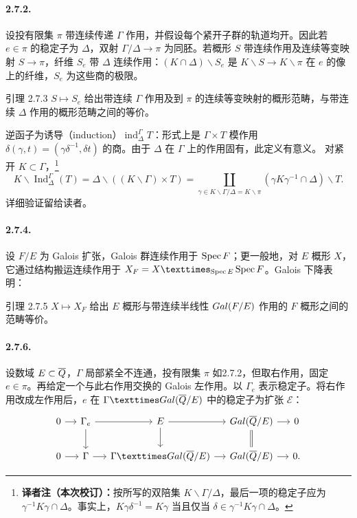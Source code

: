 \paragraph*{2.7.2.} 设投有限集 $\pi$ 带连续传递 $\Gamma$ 作用，并假设每个紧开子群的轨道均开。因此若 $e\in\pi$ 的稳定子为 $\Delta$，双射 $\Gamma/\Delta\to\pi$ 为同胚。若概形 $S$ 带连续作用及连续等变映射 $S\to\pi$，纤维 $S_e$ 带 $\Delta$ 连续作用：$(K\cap\Delta)\backslash S_e$ 是 $K\backslash S\to K\backslash\pi$ 在 $e$ 的像上的纤维，$S_e$ 为这些商的极限。
\begin{originaltheorem}{引理 2.7.3}
$S\mapsto S_e$ 给出带连续 $\Gamma$ 作用及到 $\pi$ 的连续等变映射的概形范畴，与带连续 $\Delta$ 作用的概形范畴之间的等价。
\end{originaltheorem}
逆函子为诱导（induction）$\operatorname{ind}_\Delta^\Gamma T$：形式上是 $\Gamma\times T$ 模作用 $\delta(\gamma,t)=(\gamma\delta^{-1},\delta t)$ 的商。由于 $\Delta$ 在 $\Gamma$ 上的作用固有，此定义有意义。
对紧开 $K\subset\Gamma$，\footnote{\textbf{译者注（本次校订）：}按所写的双陪集 $K\backslash\Gamma/\Delta$，最后一项的稳定子应为 $\gamma^{-1}K\gamma\cap\Delta$。事实上，$K\gamma\delta^{-1}=K\gamma$ 当且仅当 $\delta\in\gamma^{-1}K\gamma\cap\Delta$。}
\[
 K\backslash\operatorname{Ind}_\Delta^\Gamma(T)
 =\Delta\backslash((K\backslash\Gamma)\times T)
 =\coprod_{\gamma\in K\backslash\Gamma/\Delta=K\backslash\pi}
 (\gamma K\gamma^{-1}\cap\Delta)\backslash T.
\]
详细验证留给读者。
\paragraph*{2.7.4.} 设 $F/E$ 为 Galois 扩张，Galois 群连续作用于 $\operatorname{Spec} F$；更一般地，对 $E$ 概形 $X$，它通过结构搬运连续作用于 $X_F=X\times_{\Spec E}\Spec F$。Galois 下降表明：
\begin{originaltheorem}{引理 2.7.5}
$X\mapsto X_F$ 给出 $E$ 概形与带连续半线性 $Gal(F/E)$ 作用的 $F$ 概形之间的范畴等价。
\end{originaltheorem}
\paragraph*{2.7.6.} 设数域 $E\subset\overline{Q}$，$\Gamma$ 局部紧全不连通，投有限集 $\pi$ 如2.7.2，但取右作用，固定 $e\in\pi$。再给定一个与此右作用交换的 Galois 左作用。以 $\Gamma_e$ 表示稳定子。将右作用改成左作用后，$e$ 在 $\Gamma\times\Gal(\overline\Q/E)$ 中的稳定子为扩张 $\mathcal E$：
\[
 \begin{tikzcd}[column sep=small]
 0\arrow[r]&\Gamma_e\arrow[r]\arrow[d]&\mathcal E\arrow[r]\arrow[d]&\Gal(\overline\Q/E)\arrow[r]\arrow[d,equal]&0\\
 0\arrow[r]&\Gamma\arrow[r]&\Gamma\times\Gal(\overline\Q/E)\arrow[r]&\Gal(\overline\Q/E)\arrow[r]&0.
 \end{tikzcd}
\]
